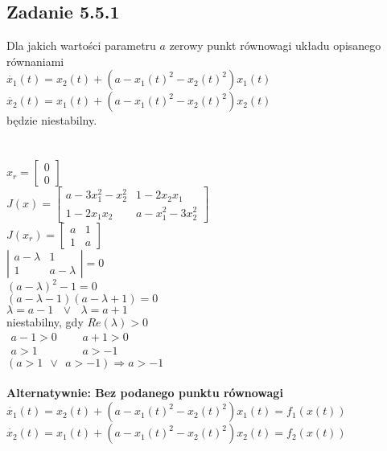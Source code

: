 \subsection*{Zadanie 5.5.1} {\color{darkgray}
	Dla jakich wartości parametru $a$ zerowy punkt równowagi układu opisanego równaniami\\
	$\dot{x_1}(t)=x_2(t)+(a-x_1(t)^2-x_2(t)^2)x_1(t)$\\
	$\dot{x_2}(t)=x_1(t)+(a-x_1(t)^2-x_2(t)^2)x_2(t)$\\
	będzie niestabilny.\\
}\lineh
\\\\
$x_r=\left[ \begin{array}{c}     0\\0   \end{array}\right]$\\
$J(x)=\left[ \begin{array}{cc}    a-3x_1^2 -x_2^2&  1-2x_2x_1 \\ 1-2x_1x_2 & a-x_1^2-3x_2^2  \end{array}\right]$\\
$J(x_r)=\left[ \begin{array}{cc}    a&1\\1&a  \end{array}\right]$\\
$\left| \begin{array}{cc}    a-\lambda&1\\1&a-\lambda  \end{array}\right| =0$\\
$(a-\lambda)^2-1=0$\\
$(a-\lambda-1)(a-\lambda+1)=0$\\
$\lambda=a-1 \ \ \ \vee \ \ \ \lambda=a+1$\\
niestabilny, gdy $Re(\lambda)>0$\\
$\begin{array}{lll}     a-1>0& \ \ \  &a+1>0  \\ a>1 && a>-1 \end{array}$\\
$(a>1 \ \ \vee \ \ a>-1 ) \Rightarrow \boxed{a>-1}$\\
\\
{\color{red} \textbf{ Alternatywnie: Bez podanego punktu równowagi}}\\
$\dot{x_1}(t)=x_2(t)+(a-x_1(t)^2-x_2(t)^2)x_1(t)=f_1(x(t))$\\
$\dot{x_2}(t)=x_1(t)+(a-x_1(t)^2-x_2(t)^2)x_2(t)=f_2(x(t))$\\
